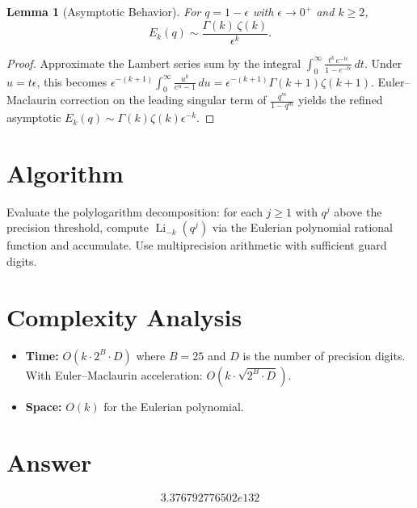 \documentclass[11pt]{article}
\newtheorem{lemma}[theorem]{Lemma}
\begin{document}
\begin{lemma}[Asymptotic Behavior]
For $q = 1 - \epsilon$ with $\epsilon \to 0^+$ and $k \ge 2$,
\[
E_k(q) \sim \frac{\Gamma(k)\,\zeta(k)}{\epsilon^k}.
\]
\end{lemma}

\begin{proof}
Approximate the Lambert series sum by the integral $\int_0^\infty \frac{t^k\,e^{-t\epsilon}}{1-e^{-t\epsilon}}\,dt$. Under $u = t\epsilon$, this becomes $\epsilon^{-(k+1)}\int_0^\infty \frac{u^k}{e^u-1}\,du = \epsilon^{-(k+1)}\Gamma(k+1)\zeta(k+1)$. Euler--Maclaurin correction on the leading singular term of $\frac{q^m}{1-q^m}$ yields the refined asymptotic $E_k(q) \sim \Gamma(k)\zeta(k)\epsilon^{-k}$.
\end{proof}

\section{Algorithm}

Evaluate the polylogarithm decomposition: for each $j \ge 1$ with $q^j$ above the precision threshold, compute $\operatorname{Li}_{-k}(q^j)$ via the Eulerian polynomial rational function and accumulate. Use multiprecision arithmetic with sufficient guard digits.

\section{Complexity Analysis}

\begin{itemize}
\item \textbf{Time:} $O(k \cdot 2^B \cdot D)$ where $B = 25$ and $D$ is the number of precision digits. With Euler--Maclaurin acceleration: $O(k \cdot \sqrt{2^B \cdot D})$.
\item \textbf{Space:} $O(k)$ for the Eulerian polynomial.
\end{itemize}

\section{Answer}

\[
\boxed{3.376792776502e132}
\]
\end{document}
